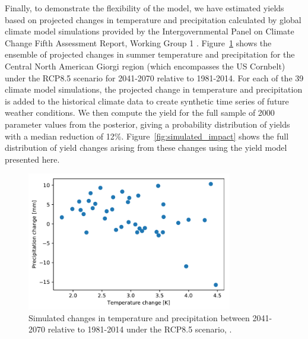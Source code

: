\documentclass[12pt]{iopart}
\begin{document}
Finally, to demonstrate the flexibility of the model, we have estimated yields based on projected changes in temperature and precipitation calculated by global climate model simulations provided by the Intergovernmental Panel on Climate Change Fifth Assessment Report, Working Group 1 \citep[http://www.climatechange2013.org/report/full-report/][]{ipcc2:2013}. Figure~\ref{fig:sim_p_t_dist} shows the ensemble of projected changes in summer temperature and precipitation for the Central North American Giorgi region (which encompasses the US Cornbelt) under the RCP8.5 scenario for 2041-2070 relative to 1981-2014. For each of the 39 climate model simulations, the projected change in temperature and precipitation is added to the historical climate data to create synthetic time series of future weather conditions. We then compute the yield for the full sample of 2000 parameter values from the posterior, giving a probability distribution of yields with a median reduction of 12\%. Figure~\ref{fig:simulated_impact} shows the full distribution of yield changes arising from these changes using the yield model presented here.

\begin{figure}
\centering
\includegraphics[width=0.8\textwidth]{./figures/sim_p_t_dist}
\caption{\label{fig:sim_p_t_dist} Simulated changes in temperature and precipitation between 2041-2070 relative to 1981-2014 under the RCP8.5 scenario, \citep[][]{ipcc2:2013}. }
\end{figure}
\end{document}
